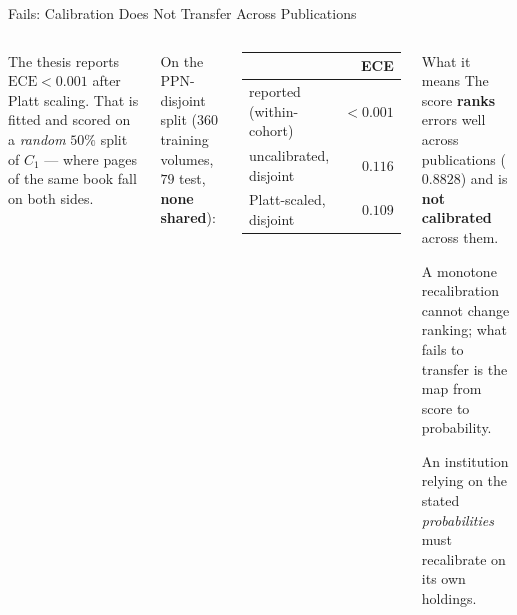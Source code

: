 \documentclass[aspectratio=169,11pt]{beamer}
\begin{document}
\begin{frame}{Fails: Calibration Does Not Transfer Across Publications}
\begin{columns}[T]
\small
The thesis reports $\text{ECE} < 0.001$ after Platt scaling. That is fitted and scored on a \emph{random} $50\%$ split of $C_1$ --- where pages of the same book fall on both sides.
\vspace{2mm}

On the PPN-disjoint split ($360$ training volumes, $79$ test, \textbf{none shared}):
\vspace{1mm}
\begin{center}
\footnotesize
\begin{tabular}{@{}l r@{}}
\toprule
& \textbf{ECE} \\
\midrule
reported (within-cohort) & $< 0.001$ \\
uncalibrated, disjoint & $0.116$ \\
Platt-scaled, disjoint & $\mathbf{0.109}$ \\
\bottomrule
\end{tabular}
\end{center}

\begin{alertblock}{\small What it means}
\footnotesize The score \textbf{ranks} errors well across publications ($0.8828$) and is \textbf{not calibrated} across them.
\vspace{1mm}

A monotone recalibration cannot change ranking; what fails to transfer is the map from score to probability.
\vspace{1mm}

An institution relying on the stated \emph{probabilities} must recalibrate on its own holdings.
\end{alertblock}
\end{columns}
\end{frame}
\end{document}
